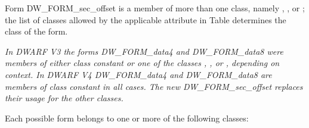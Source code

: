 Form DW\_FORM\_sec\_offset is a member of more than one class,
namely , ,  or ; the list
of classes allowed by the applicable attribute in 
Table 
determines the class of the form.

\textit{In DWARF V3 the forms DW\_FORM\_data4 and DW\_FORM\_data8 were
members of either class constant or one of the classes ,
,  or , depending on context. In
DWARF V4 DW\_FORM\_data4 and DW\_FORM\_data8 are members of class
constant in all cases. The new DW\_FORM\_sec\_offset replaces
their usage for the other classes.}

Each possible form belongs to one or more of the following classes:

